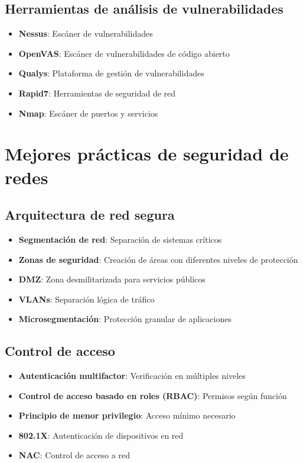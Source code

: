 \subsection{Herramientas de análisis de vulnerabilidades}

\begin{itemize}
    \item \textbf{Nessus}: Escáner de vulnerabilidades
    \item \textbf{OpenVAS}: Escáner de vulnerabilidades de código abierto
    \item \textbf{Qualys}: Plataforma de gestión de vulnerabilidades
    \item \textbf{Rapid7}: Herramientas de seguridad de red
    \item \textbf{Nmap}: Escáner de puertos y servicios
\end{itemize}

\section{Mejores prácticas de seguridad de redes}

\subsection{Arquitectura de red segura}

\begin{itemize}
    \item \textbf{Segmentación de red}: Separación de sistemas críticos
    \item \textbf{Zonas de seguridad}: Creación de áreas con diferentes niveles de protección
    \item \textbf{DMZ}: Zona desmilitarizada para servicios públicos
    \item \textbf{VLANs}: Separación lógica de tráfico
    \item \textbf{Microsegmentación}: Protección granular de aplicaciones
\end{itemize}

\subsection{Control de acceso}

\begin{itemize}
    \item \textbf{Autenticación multifactor}: Verificación en múltiples niveles
    \item \textbf{Control de acceso basado en roles (RBAC)}: Permisos según función
    \item \textbf{Principio de menor privilegio}: Acceso mínimo necesario
    \item \textbf{802.1X}: Autenticación de dispositivos en red
    \item \textbf{NAC}: Control de acceso a red
\end{itemize}

